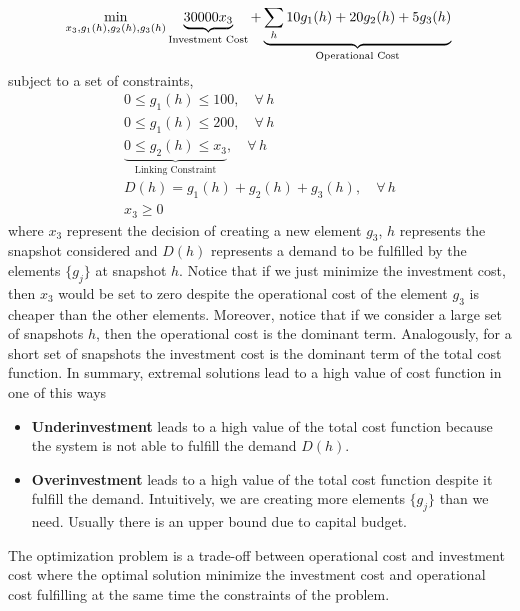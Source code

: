 \begin{equation}
    \min_{x_{3},g_{1}(h),g_{2}(h),g_{3}(h)}\underbrace{30000x_{3}}_{\text{Investment Cost}} + \underbrace{\sum_{h}10g_{1}(h)+20g_{2}(h) + 5g_{3}(h)}_{\text{Operational Cost}}\\ 
\end{equation}
subject to a set of constraints,
\begin{align}
    0 \leq g_{1}(h) \leq 100, \quad \forall\,h\\
    0 \leq g_{1}(h) \leq 200, \quad \forall\,h\\
    \underbrace{0 \leq g_{2}(h) \leq x_{3}}_{\text{Linking Constraint}}, \quad \forall\,h \\
    D(h) = g_{1}(h) + g_{2}(h) + g_{3}(h), \quad \forall\,h \\
    x_{3} \geq 0
\end{align}
where $x_{3}$ represent the decision of creating a new element $g_{3}$, $h$ represents the snapshot considered and $D(h)$ represents a demand to be fulfilled by the elements $\{g_{j}\}$ at snapshot $h$. Notice that if we just minimize the investment cost, then $x_{3}$ would be set to zero despite the operational cost of the element $g_{3}$ is cheaper than the other elements. Moreover, notice that if we consider a large set of snapshots $h$, then the operational cost is the dominant term. Analogously, for a short set of snapshots the investment cost is the dominant term of the total cost function. In summary, extremal solutions lead to a high value of cost function in one of this ways
\begin{itemize}
    \item \textbf{Underinvestment} leads to a high value of the total cost function because the system is not able to fulfill the demand $D(h)$.
    \item \textbf{Overinvestment} leads to a high value of the total cost function despite it fulfill the demand. Intuitively, we are creating more elements $\{g_{j}\}$ than we need. Usually there is an upper bound due to capital budget.
\end{itemize}
The optimization problem is a trade-off between operational cost and investment cost where the optimal solution minimize the investment cost and operational cost fulfilling at the same time the constraints of the problem.

